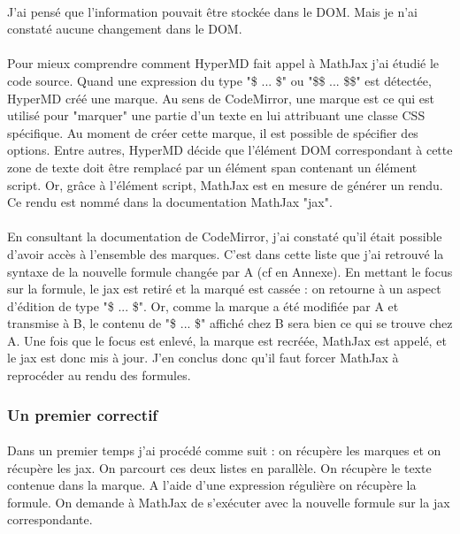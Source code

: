 \documentclass[12pt]{article}
\begin{document}
\paragraph{}
J'ai pensé que l'information pouvait être stockée dans le DOM. Mais je n'ai constaté aucune changement dans le DOM.
\paragraph{}
Pour mieux comprendre comment HyperMD fait appel à MathJax j'ai étudié le code source. Quand une expression du type "\$ ... \$" ou "\$\$ ... \$\$" est détectée, HyperMD créé une marque. Au sens de CodeMirror, une marque est ce qui est utilisé pour "marquer" une partie d'un texte en lui attribuant une classe CSS spécifique. Au moment de créer cette marque, il est possible de spécifier des options. Entre autres, HyperMD décide que l'élément DOM correspondant à cette zone de texte doit être remplacé par un élément span contenant un élément script.
Or, grâce à l'élément script, MathJax est en mesure de générer un rendu. Ce rendu est nommé dans la documentation MathJax "jax".
\paragraph{}
En consultant la documentation de CodeMirror, j'ai constaté qu'il était possible d'avoir accès à l'ensemble des marques. C'est dans cette liste que j'ai retrouvé la syntaxe de la nouvelle formule changée par A (cf en Annexe). En mettant le focus sur la formule, le jax est retiré et la marqué est cassée : on retourne à un aspect d'édition de type "\$ ... \$". Or, comme la marque a été modifiée par A et transmise à B, le contenu de "\$ ... \$" affiché chez B sera bien ce qui se trouve chez A. Une fois que le focus est enlevé, la marque est recréée, MathJax est appelé, et le jax est donc mis à jour. J'en conclus donc qu'il faut forcer MathJax à reprocéder au rendu des formules.\\

\subsubsection{Un premier correctif}
\paragraph{}
Dans un premier temps j'ai procédé comme suit : on récupère les marques et on récupère les jax. On parcourt ces deux listes en parallèle. On récupère le texte contenue dans la marque. A l'aide d'une expression régulière on récupère la formule. On demande à MathJax de s'exécuter avec la nouvelle formule sur la jax correspondante.
\end{document}
